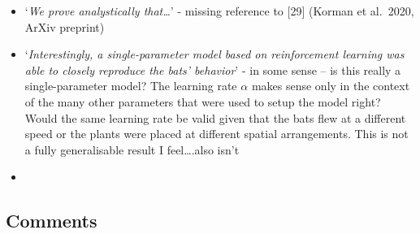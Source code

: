 \documentclass[
]{book}
\begin{document}
\begin{itemize}
\item
  `\emph{We prove analystically that\ldots{}}' - missing reference to {[}29{]} (Korman et al.~2020, ArXiv preprint)
\item
  `\emph{Interestingly, a single-parameter model based on reinforcement learning was able to closely reproduce the bats' behavior}' - in some sense -- is this really a single-parameter model? The learning rate \(\alpha\) makes sense only in the context of the many other parameters that were used to setup the model right? Would the same learning rate be valid given that the bats flew at a different speed or the plants were placed at different spatial arrangements. This is not a fully generalisable result I feel\ldots.also isn't
\item
\end{itemize}

\hypertarget{comments}{%
\subsection{Comments}\label{comments}}
\end{document}
